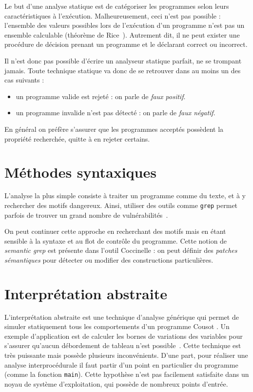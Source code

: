 Le but d'une analyse statique est de catégoriser les programmes selon leurs
caractéristiques à l'exécution. Malheureusement, ceci n'est pas possible :
l'ensemble des valeurs possibles lors de l'exécution d'un programme n'est pas un
ensemble calculable (théorème de Rice~\cite{rice}). Autrement dit, il ne peut
exister une procédure de décision prenant un programme et le déclarant correct
ou incorrect.

Il n'est donc pas possible d'écrire un analyseur statique parfait, ne se
trompant jamais. Toute technique statique va donc de se retrouver dans au moins
un des cas suivants :

\begin{itemize}
\item
  un programme valide est rejeté : on parle de \emph{faux positif}.
\item
  un programme invalide n'est pas détecté : on parle de
  \emph{faux négatif}.
\end{itemize}

En général on préfère s'assurer que les programmes acceptés possèdent la
propriété recherchée, quitte à en rejeter certains.

\section{Méthodes syntaxiques}

L'analyse la plus simple consiste à traiter un programme comme du texte, et à y
rechercher des motifs dangereux. Ainsi, utiliser des outils comme \texttt{grep}
permet parfois de trouver un grand nombre de vulnérabilités~\cite{SpenderGrep}.

On peut continuer cette approche en recherchant des motifs mais en étant
sensible à la syntaxe et au flot de contrôle du programme. Cette notion de
\emph{semantic grep} est présente dans l'outil Coccinelle
\cite{coccinelle09,coccinelle11} : on peut définir des
\emph{patches sémantiques} pour détecter ou modifier des constructions
particulières.


\section{Interprétation abstraite}

L'interprétation abstraite est une technique d'analyse générique qui permet de
simuler statiquement tous les comportements d'un programme Cousot
\cite{Cousot77,Cousot92-1}. Un exemple d'application est de calculer les bornes
de variations des variables pour s'assurer qu'aucun débordement de tableau n'est
possible~\cite{AllamigeonHymansSSTIC07}. Cette technique est très puissante mais
possède plusieurs inconvénients. D'une part, pour réaliser une analyse
interprocédurale il faut partir d'un point en particulier du programme (comme la
fonction \texttt{main}). Cette hypothèse n'est pas facilement satisfaite dans un
noyau de système d'exploitation, qui possède de nombreux points d'entrée.

